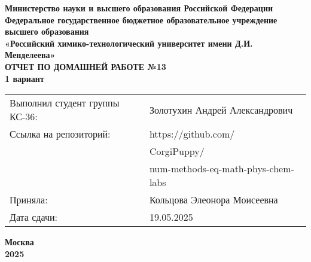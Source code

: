 \documentclass[12pt, a4paper]{report}
\begin{document}
	\begin{titlepage}
		\begin{center}
			\large \textbf{Министерство науки и высшего образования Российской Федерации} \\
			\large \textbf{Федеральное государственное бюджетное образовательное учреждение высшего образования} \\
			\large \textbf{«Российский химико-технологический университет имени Д.И. Менделеева»} \\

			\vspace*{4cm}
			\LARGE \textbf{ОТЧЕТ ПО ДОМАШНЕЙ РАБОТЕ №13} \\
			\Large \textbf{1 вариант}

			\vspace*{3cm}
			\begin{flushright}
				\Large
				\begin{tabular}{>{\raggedleft\arraybackslash}p{9cm} p{10cm}}
					Выполнил студент группы КС-36: & Золотухин Андрей Александрович \\
					Ссылка на репозиторий: & https://github.com/ \\
					& CorgiPuppy/ \\
					& num-methods-eq-math-phys-chem-labs \\
					Приняла: & Кольцова Элеонора Моисеевна \\
					Дата сдачи: & 19.05.2025 \\
				\end{tabular}
			\end{flushright}

			\vspace*{6cm}
			\Large \textbf{Москва \\ 2025}
		\end{center}
	\end{titlepage}

	\tableofcontents
	\thispagestyle{empty}
	\newpage

\end{document}

